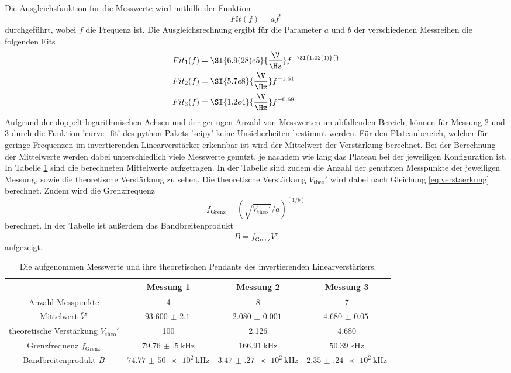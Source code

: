 Die Ausgleichsfunktion für die Messwerte wird mithilfe der Funktion
\begin{equation}
    Fit(f) = a f^b
    \label{eq:fit}
\end{equation}
durchgeführt, wobei $f$ die Frequenz ist.
Die Ausgleichsrechnung ergibt für die Parameter $a$ und $b$ der verschiedenen Messreihen die folgenden Fits
\begin{align}
    Fit_1(f) &= \SI{6.9(28)e5}{\frac{\V}{\Hz}} f^{-\SI{1.02(4)}{}} \\
    Fit_2(f) &= \SI{5.7e8}{\frac{\V}{\Hz}} f^{-1.51}\\
    Fit_3(f) &= \SI{1.2e4}{\frac{\V}{\Hz}} f^{-0.68}
\end{align}
Aufgrund der doppelt logarithmischen Achsen und der geringen Anzahl von Messwerten im abfallenden Bereich, können für Messung 2 und 3 durch die Funktion 'curve\_fit' des python Pakets 'scipy' \cite{scipy} keine Unsicherheiten bestimmt werden.
Für den Plateaubereich, welcher für geringe Frequenzen im invertierenden Linearverstärker erkennbar ist wird der Mittelwert der Verstärkung berechnet.
Bei der Berechnung der Mittelwerte werden dabei unterschiedlich viele Messwerte genutzt, je nachdem wie lang das Plateau bei der jeweiligen Konfiguration ist.
In Tabelle \ref{tab:inv_lin_mittel} sind die berechneten Mittelwerte aufgetragen. 
In der Tabelle sind zudem die Anzahl der genutzten Messpunkte der jeweiligen Messung, sowie die theoretische Verstärkung zu sehen.
Die theoretische Verstärkung $V_\text{theo}'$ wird dabei nach Gleichung \eqref{eq:verstaerkung} berechnet.
Zudem wird die Grenzfrequenz 
\begin{equation*}
  f_\text{Grenz} = \left(\sqrt{V_\text{theo}'}/a\right)^{(1/b)}
\end{equation*}
berechnet.
In der Tabelle ist außerdem das Bandbreitenprodukt
\begin{equation*}
    B = f_\text{Grenz}\bar{V}'
\end{equation*}
aufgezeigt.
\begin{table}[H]
    \hspace*{-2cm}\begin{tabular}{cccc}
        \toprule
         & Messung 1 & Messung 2 & Messung 3\\
        \midrule
        Anzahl Messpunkte & 4 & 8 & 7 \\
        Mittelwert $\bar{V}'$ & $\SI{93.600(2100)}{}$ &  $\SI{2.080(1)}{} $&  $\SI{4.680(50)}{} $ \\
        theoretische Verstärkung $V_\text{theo}'$ & 100 & 2.126 & 4.680 \\
        Grenzfrequenz $f_\text{Grenz}$ & $\SI{79.76(50)}{\kilo\Hz}$ & $\SI{166.91}{\kilo\Hz} $& $\SI{50.39}{\kilo\Hz}$  \\
        Bandbreitenprodukt $B$ & $\SI{74.77(5000)e2}{\kilo\Hz}$ & $\SI{3.47(27)e2}{\kilo\Hz}$ & $\SI{2.35(24)e2}{\kilo\Hz}$ \\
        \bottomrule
    \end{tabular}
    \caption{Die aufgenommen Messwerte und ihre theoretischen Pendants des invertierenden Linearverstärkers.}
    \label{tab:inv_lin_mittel}
\end{table} 
